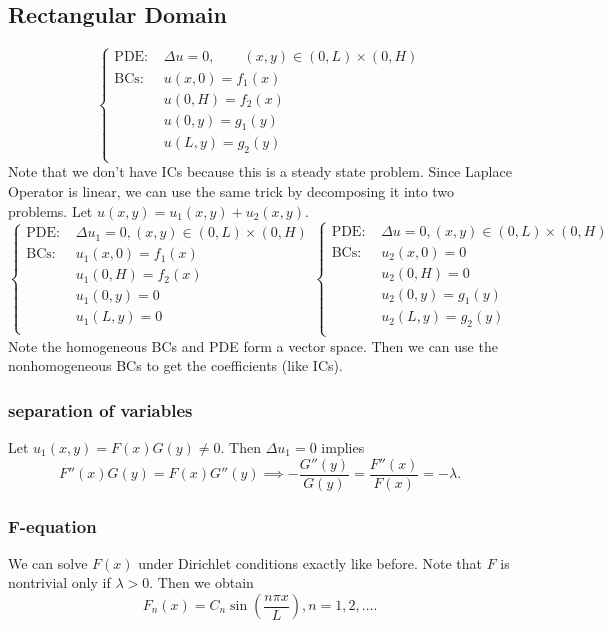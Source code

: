 \documentclass[class=article,crop=false]{standalone}
\begin{document}
\subsection{Rectangular Domain}
\begin{equation*}
\begin{cases}
	\text{PDE: }& \Delta u =0, \qquad (x,y) \in (0,L) \times (0,H) \\
	\text{BCs: }& u(x,0) =f_1(x)  \\
		    &u(0,H)=f_2(x)\\
		    &u(0,y)=g_1(y)\\
		    &u(L,y) = g_2(y)\\
\end{cases}
\end{equation*}
Note that we don't have ICs because this is a steady state problem. Since Laplace Operator is linear, we can use the same trick by decomposing it into two problems. Let $ u(x,y)=u_1(x,y)+u_2(x,y)$.
\begin{equation*}
\begin{cases}
	\text{PDE: }& \Delta u_1 =0, (x,y) \in (0,L) \times (0,H) \\
	\text{BCs: }& u_1(x,0) =f_1(x)  \\
		    &u_1(0,H)=f_2(x)\\
		    &u_1(0,y)=0\\
		    &u_1(L,y) = 0\\
\end{cases}
\begin{cases}
	\text{PDE: }& \Delta u =0, (x,y) \in (0,L) \times (0,H) \\
	\text{BCs: }& u_2(x,0) =0  \\
		    &u_2(0,H)=0\\
		    &u_2(0,y)=g_1(y)\\
		    &u_2(L,y) = g_2(y)\\
\end{cases}
\end{equation*}
Note the homogeneous BCs and PDE form a vector space. Then we can use the nonhomogeneous BCs to get the coefficients (like ICs).

\subsubsection{separation of variables}
Let $ u_1(x,y)=F(x)G(y) \neq 0$. Then $ \Delta u_1=0$ implies
\[
	F''(x)G(y)=F(x)G''(y) \implies -\frac{G''(y)}{G(y) }=\frac{F''(x)}{F(x) } = -\lambda
.\] 
\subsubsection{F-equation}
We can solve $ F(x)$ under Dirichlet conditions exactly like before. Note that $ F$ is nontrivial only if  $ \lambda >0$. Then we obtain
\[
	F_n(x) = C_n \sin \left( \frac{ n\pi x}{ L} \right) , n=1,2,\ldots
.\]
\end{document}
